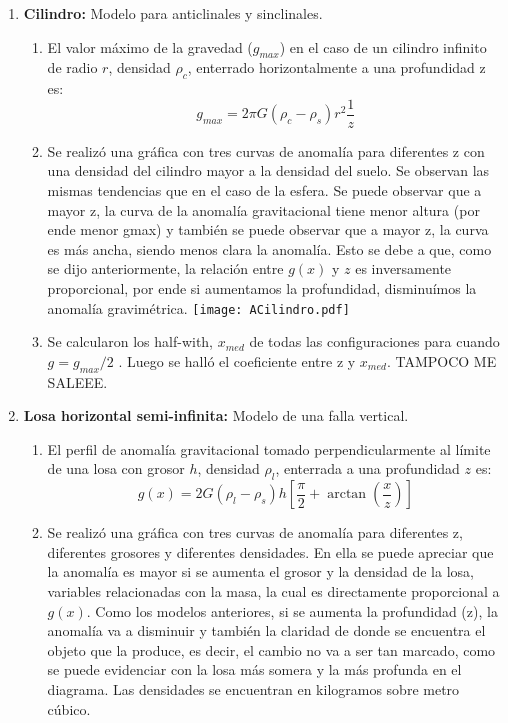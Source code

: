 \documentclass{article}
\begin{document}
\begin{enumerate}
\item {\bf Cilindro:} Modelo para anticlinales y sinclinales.
	\begin{enumerate}
	\item El valor m\'aximo de la gravedad ($g_{max}$) en el caso de un cilindro infinito de radio $r$, densidad $\rho_c$, enterrado horizontalmente a una profundidad z es: 
\begin{equation*}
g_{max} = 2\pi G(\rho_c-\rho_s)r^{2}\frac{1}{z}
\end{equation*}
	\item Se realiz\'o una gr\'afica con tres curvas de anomal\'ia para diferentes z con una densidad del cilindro mayor a la densidad del suelo. Se observan las mismas tendencias que en el caso de la esfera. Se puede observar que a mayor z, la curva de la anomal\'ia gravitacional tiene menor altura (por ende menor gmax) y tambi\'en se puede observar que a mayor z, la curva es m\'as ancha, siendo menos clara la anomal\'ia. Esto se debe a que, como se dijo anteriormente, la relaci\'on entre $g(x)$ y $z$ es inversamente proporcional, por ende si aumentamos la profundidad, disminu\'imos la anomal\'ia gravim\'etrica.
	\texttt{[image: ACilindro.pdf]}
	\item Se calcularon los half-with, $x_{med}$ de todas las configuraciones para cuando $g = g_{max}/2$ . Luego se halló el coeficiente entre z y $x_{med}$. TAMPOCO ME SALEEE.
	\end{enumerate}
\item {\bf Losa horizontal semi-infinita:} Modelo de una falla vertical.
	\begin{enumerate}
	\item El perfil de anomal\'ia gravitacional tomado perpendicularmente al l\'imite de una losa con grosor $h$, densidad $\rho_l$, enterrada a una profundidad $z$ es:
	\begin{equation*}
	g(x) = 2G(\rho_l-\rho_s)h[\frac{\pi}{2} + \arctan(\frac{x}{z})]
	\end{equation*}
	\item Se realiz\'o una gr\'afica con tres curvas de anomal\'ia para diferentes z, diferentes grosores y diferentes densidades. En ella se puede apreciar que la anomal\'ia es mayor si se aumenta el grosor y la densidad de la losa, variables relacionadas con la masa, la cual es directamente proporcional a $g(x)$. Como los modelos anteriores, si se aumenta la profundidad (z), la anomal\'ia va a disminuir y tambi\'en la claridad de donde se encuentra el objeto que la produce, es decir, el cambio no va a ser tan marcado, como se puede evidenciar con la losa m\'as somera y la m\'as profunda en el diagrama. Las densidades se encuentran en kilogramos sobre metro c\'ubico.

\end{enumerate}
\end{enumerate}
\end{document}
